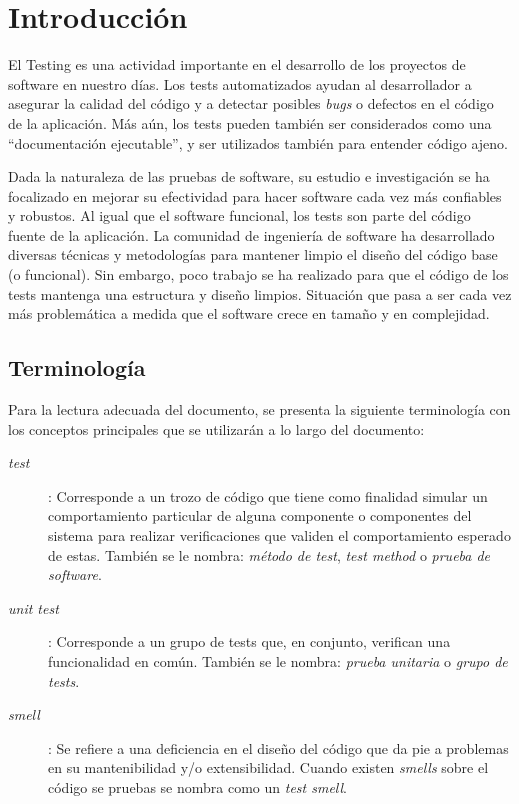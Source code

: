 \chapter{Introducción} 
\par El Testing es una actividad importante en el desarrollo de los proyectos de software en nuestro días. Los tests automatizados ayudan al desarrollador a asegurar la calidad del código y a detectar posibles \emph{bugs} o defectos en el código de la aplicación. Más aún, los tests pueden también ser considerados como  una ``documentación ejecutable'', y ser utilizados también para entender código ajeno.

\par Dada la naturaleza de las pruebas de software, su estudio e investigación se ha focalizado en mejorar su efectividad para hacer software cada vez más confiables y robustos. Al igual que el software funcional, los tests son parte del código fuente de la aplicación. La comunidad de ingeniería de software ha desarrollado diversas técnicas y metodologías para mantener limpio el diseño del código base (o funcional). Sin embargo, poco trabajo se ha realizado para que  el código de los tests mantenga una estructura y diseño limpios. Situación que pasa a ser cada vez más problemática a medida que el software crece en tamaño y en complejidad.


\section{Terminología}

\par Para la lectura adecuada del documento, se presenta la siguiente terminología con los conceptos principales que se utilizarán a lo largo del documento:

\begin{description}
\item[\emph{test}]: Corresponde a un trozo de código que tiene como finalidad simular un comportamiento particular de alguna componente o componentes del sistema para realizar verificaciones que validen el comportamiento esperado de estas. También se le nombra: \emph{método de test}, \emph{test method} o \emph{prueba de software}.
\item[\emph{unit test}]: Corresponde a un grupo de tests que, en conjunto, verifican una funcionalidad en común. También se le nombra: \emph{prueba unitaria} o \emph{grupo de tests}.
\item[\emph{smell}]: Se refiere a una deficiencia en el diseño del código que da pie a problemas en su mantenibilidad y/o extensibilidad. Cuando existen \emph{smells} sobre el código se pruebas se nombra como un \emph{test smell}.
\end{description}

